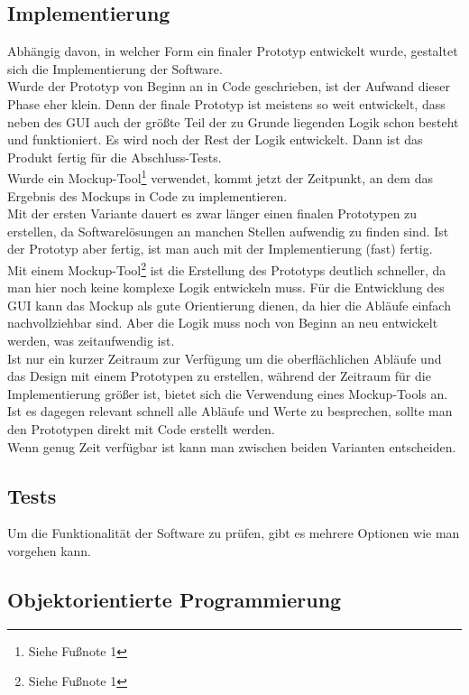 \documentclass[10pt,a4paper]{article}
\begin{document}
\subsection{Implementierung}
Abhängig davon, in welcher Form ein finaler Prototyp entwickelt wurde, gestaltet sich die Implementierung der Software.
\\Wurde der Prototyp von Beginn an in Code geschrieben, ist der Aufwand dieser Phase eher klein. Denn der finale Prototyp ist meistens so weit entwickelt, dass neben des GUI auch der größte Teil der zu Grunde liegenden Logik schon besteht und funktioniert. Es wird noch der Rest der Logik entwickelt. Dann ist das Produkt fertig für die Abschluss-Tests.\\Wurde ein Mockup-Tool\footnote{Siehe Fußnote 1} verwendet, kommt jetzt der Zeitpunkt, an dem das Ergebnis des Mockups in Code zu implementieren. 
\\Mit der ersten Variante dauert es zwar länger einen finalen Prototypen zu erstellen, da Softwarelösungen an manchen Stellen aufwendig zu finden sind. Ist der Prototyp aber fertig, ist man auch mit der Implementierung (fast) fertig. 
\\Mit einem Mockup-Tool\footnote{Siehe Fußnote 1} ist die Erstellung des Prototyps deutlich schneller, da man hier noch keine komplexe Logik entwickeln muss. Für die Entwicklung des GUI kann das Mockup als gute Orientierung dienen, da hier die Abläufe einfach nachvollziehbar sind. Aber die Logik muss noch von Beginn an neu entwickelt werden, was zeitaufwendig ist. 
\\Ist nur ein kurzer Zeitraum zur Verfügung um die oberflächlichen Abläufe und das Design mit einem Prototypen zu erstellen, während der Zeitraum für die Implementierung größer ist, bietet sich die Verwendung eines Mockup-Tools an. Ist es dagegen relevant schnell alle Abläufe und Werte zu besprechen, sollte man den Prototypen direkt mit Code erstellt werden.\\
Wenn genug Zeit verfügbar ist kann man zwischen beiden Varianten entscheiden.
\subsection{Tests}
Um die Funktionalität der Software zu prüfen, gibt es mehrere Optionen wie man vorgehen kann.

\subsection{Objektorientierte Programmierung}
\label{Objektorientierte Programmierung}
\end{document}
